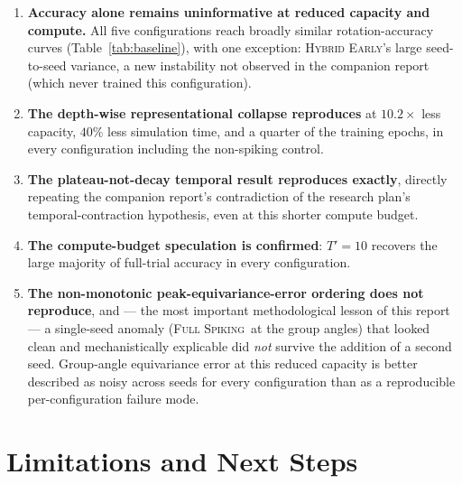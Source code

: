 \documentclass[11pt]{article}
\newcommand{\FullSpiking}{\textsc{Full Spiking}}
\newcommand{\HybridEarly}{\textsc{Hybrid Early}}
\begin{document}
\begin{enumerate}[leftmargin=1.5em]
\item \textbf{Accuracy alone remains uninformative at reduced capacity and compute.} All five
configurations reach broadly similar rotation-accuracy curves (Table~\ref{tab:baseline}), with one
exception: \HybridEarly's large seed-to-seed variance, a new instability not observed in the companion
report (which never trained this configuration).
\item \textbf{The depth-wise representational collapse reproduces} at $10.2\times$ less capacity,
$40\%$ less simulation time, and a quarter of the training epochs, in every configuration including
the non-spiking control.
\item \textbf{The plateau-not-decay temporal result reproduces exactly}, directly repeating the
companion report's contradiction of the research plan's temporal-contraction hypothesis, even at this
shorter compute budget.
\item \textbf{The compute-budget speculation is confirmed}: $T'=10$ recovers the large majority of
full-trial accuracy in every configuration.
\item \textbf{The non-monotonic peak-equivariance-error ordering does not reproduce}, and --- the most
important methodological lesson of this report --- a single-seed anomaly (\FullSpiking\ at the group
angles) that looked clean and mechanistically explicable did \emph{not} survive the addition of a
second seed. Group-angle equivariance error at this reduced capacity is better described as noisy
across seeds for every configuration than as a reproducible per-configuration failure mode.
\end{enumerate}

\section{Limitations and Next Steps}
\label{sec:limitations}
\end{document}

